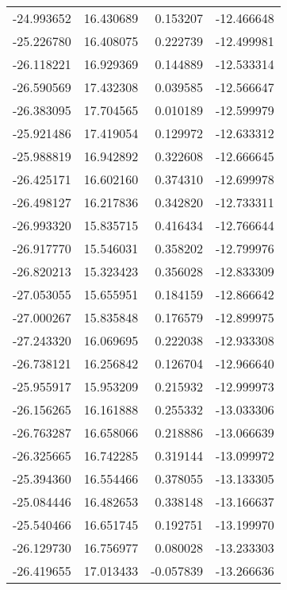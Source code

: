 \begin{tabular}{rrrr}
      -24.993652 &        16.430689 &    0.153207 & -12.466648 \\
      -25.226780 &        16.408075 &    0.222739 & -12.499981 \\
      -26.118221 &        16.929369 &    0.144889 & -12.533314 \\
      -26.590569 &        17.432308 &    0.039585 & -12.566647 \\
      -26.383095 &        17.704565 &    0.010189 & -12.599979 \\
      -25.921486 &        17.419054 &    0.129972 & -12.633312 \\
      -25.988819 &        16.942892 &    0.322608 & -12.666645 \\
      -26.425171 &        16.602160 &    0.374310 & -12.699978 \\
      -26.498127 &        16.217836 &    0.342820 & -12.733311 \\
      -26.993320 &        15.835715 &    0.416434 & -12.766644 \\
      -26.917770 &        15.546031 &    0.358202 & -12.799976 \\
      -26.820213 &        15.323423 &    0.356028 & -12.833309 \\
      -27.053055 &        15.655951 &    0.184159 & -12.866642 \\
      -27.000267 &        15.835848 &    0.176579 & -12.899975 \\
      -27.243320 &        16.069695 &    0.222038 & -12.933308 \\
      -26.738121 &        16.256842 &    0.126704 & -12.966640 \\
      -25.955917 &        15.953209 &    0.215932 & -12.999973 \\
      -26.156265 &        16.161888 &    0.255332 & -13.033306 \\
      -26.763287 &        16.658066 &    0.218886 & -13.066639 \\
      -26.325665 &        16.742285 &    0.319144 & -13.099972 \\
      -25.394360 &        16.554466 &    0.378055 & -13.133305 \\
      -25.084446 &        16.482653 &    0.338148 & -13.166637 \\
      -25.540466 &        16.651745 &    0.192751 & -13.199970 \\
      -26.129730 &        16.756977 &    0.080028 & -13.233303 \\
      -26.419655 &        17.013433 &   -0.057839 & -13.266636 \\

\end{tabular}
